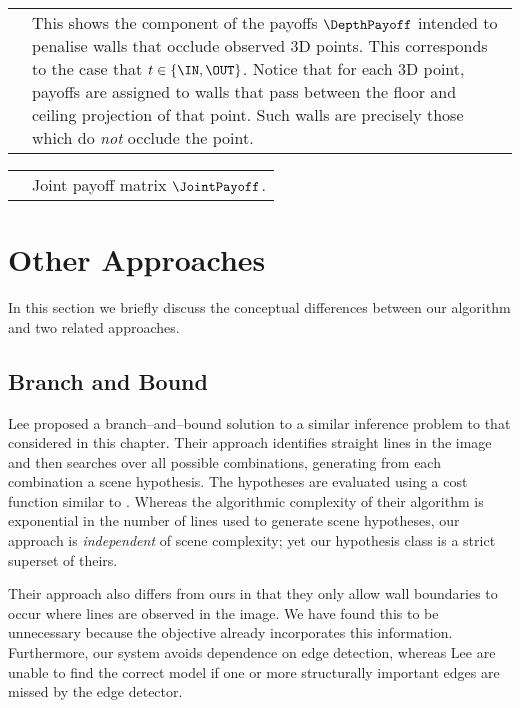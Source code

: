 \begin{tabular}{IT}
   &
  This shows the component of the payoffs $\DepthPayoff$ intended to
  penalise walls that occlude observed 3D points. This corresponds to
  the case that $t\in\{\IN,\OUT\}$. Notice that for each 3D point,
  payoffs are assigned to walls that pass between the floor and
  ceiling projection of that point. Such walls are precisely those
  which do \textit{not} occlude the point.\\
\end{tabular}
\qquad

\begin{tabular}{IT}
   &
  Joint payoff matrix $\JointPayoff$. \\
\end{tabular}

\section{Other Approaches}

In this section we briefly discuss the conceptual differences between
our algorithm and two related approaches.

\subsection{Branch and Bound}
Lee \etal \cite{Lee09} proposed a branch--and--bound solution to a
similar inference problem to that considered in this chapter. Their
approach identifies straight lines in the image and then searches over
all possible combinations, generating from each combination a scene
hypothesis. The hypotheses are evaluated using a cost function similar
to . Whereas the algorithmic complexity of their
algorithm is exponential in the number of lines used to generate scene
hypotheses, our approach is \textit{independent} of scene complexity;
yet our hypothesis class is a strict superset of theirs.

Their approach also differs from ours in that they only allow wall
boundaries to occur where lines are observed in the image. We have
found this to be unnecessary because the objective
 already incorporates this
information. Furthermore, our system avoids dependence on edge
detection, whereas Lee \etal are unable to find the correct model if
one or more structurally important edges are missed by the edge
detector.

